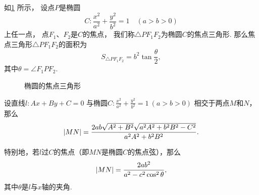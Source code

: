 \begin{theorem}[椭圆的焦点三角形]
如\cref{figure:解析几何.椭圆的焦点三角形} 所示，%
设点\(P\)是椭圆\[
	C: \frac{x^2}{a^2} + \frac{y^2}{b^2} = 1
	\quad(a>b>0)
\]上任一点，%
点\(F_1\)、\(F_2\)是\(C\)的焦点，
我们称\(\triangle P F_1 F_2\)为椭圆\(C\)的焦点三角形.
那么焦点三角形\(\triangle P F_1 F_2\)的面积为\[
S_{\triangle P F_1 F_2} = b^2 \tan\frac{\theta}{2},
\]其中\(\theta=\angle{F_1 P F_2}\).

\begin{figure}[ht]
\centering
{}
\caption{椭圆的焦点三角形}
\label{figure:解析几何.椭圆的焦点三角形}
\end{figure}
\end{theorem}

\begin{theorem}[椭圆的弦长]
设直线\(l: Ax+By+C=0\)
与椭圆\(C: \frac{x^2}{a^2} + \frac{y^2}{b^2} = 1\ (a>b>0)\)
相交于两点\(M\)和\(N\)，那么
\begin{equation}
\abs{MN} = \frac{2ab\sqrt{A^2+B^2}\sqrt{a^2 A^2 + b^2 B^2 - C^2}}{a^2 A^2 + b^2 B^2}.
\end{equation}

特别地，若\(l\)过\(C\)的焦点（即\(MN\)是椭圆\(C\)的焦点弦），那么
\begin{equation}
\abs{MN} = \frac{2ab^2}{a^2 - c^2 \cos^2\theta},
\end{equation}
其中\(\theta\)是\(l\)与\(x\)轴的夹角.
\end{theorem}


